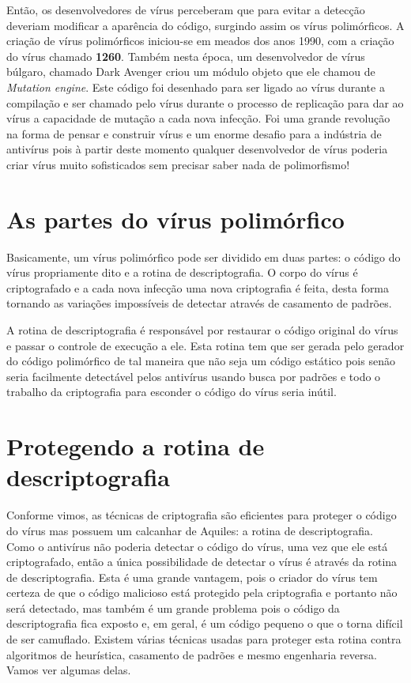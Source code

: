 Então, os desenvolvedores de vírus perceberam que para evitar a detecção deveriam modificar a aparência do código, surgindo assim os vírus polimórficos. A criação de vírus polimórficos iniciou-se em meados dos anos 1990, com a criação do vírus chamado \textbf{1260}\cite{wiki:8}. Também nesta época, um desenvolvedor de vírus búlgaro, chamado Dark Avenger\cite{wiki:9} criou um módulo objeto que ele chamou de \textit{Mutation engine}. Este código foi desenhado para ser ligado ao vírus durante a compilação e ser chamado pelo vírus durante o processo de replicação para dar ao vírus a capacidade de mutação a cada nova infecção. Foi uma grande revolução na forma de pensar e construir vírus e um enorme desafio para a indústria de antivírus pois à partir deste momento qualquer desenvolvedor de vírus poderia criar vírus muito sofisticados sem precisar saber nada de polimorfismo!

\section{As partes do vírus polimórfico}
Basicamente, um vírus polimórfico pode ser dividido em duas partes: o código do vírus propriamente dito e a rotina de descriptografia. O corpo do vírus é criptografado e a cada nova infecção uma nova criptografia é feita, desta forma tornando as variações impossíveis de detectar através de casamento de padrões.

A rotina de descriptografia é responsável por restaurar o código original do vírus e passar o controle de execução a ele. Esta rotina tem que ser gerada pelo gerador do código polimórfico de tal maneira que não seja um código estático pois senão seria facilmente detectável pelos antivírus usando busca por padrões e todo o trabalho da criptografia para esconder o código do vírus seria inútil.

\section{Protegendo a rotina de descriptografia}
Conforme vimos, as técnicas de criptografia são eficientes para proteger o código do vírus mas possuem um calcanhar de Aquiles: a rotina de descriptografia. Como o antivírus não poderia detectar o código do vírus, uma vez que ele está criptografado, então a única possibilidade de detectar o vírus é através da rotina de descriptografia. Esta é uma grande vantagem, pois o criador do vírus tem certeza de que o código malicioso está protegido pela criptografia e portanto não será detectado, mas também é um grande problema pois o código da descriptografia fica exposto e, em geral, é um código pequeno o que o torna difícil de ser camuflado. Existem várias técnicas usadas para proteger esta rotina contra algoritmos de heurística, casamento de padrões e mesmo engenharia reversa. Vamos ver algumas delas.

